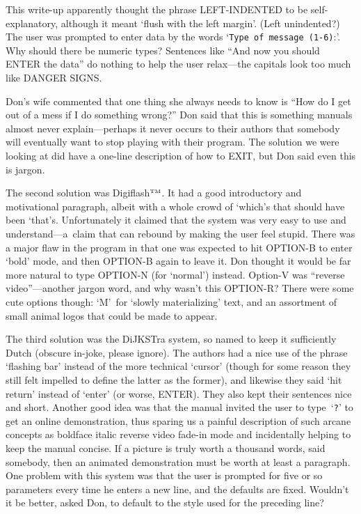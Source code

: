 This write-up apparently thought the phrase LEFT-INDENTED to be
self-explanatory, although it meant `flush with the left margin'.
(Left unindented?)
The user was prompted to enter data by the words
`{\tt Type of message (1-6)}:'.
Why should there be numeric types? Sentences like ``And now you
should ENTER the data'' do nothing to help the user relax---the capitals
look too much like DANGER SIGNS.

Don's wife commented that one thing she always needs to know is
``How do I get out of a mess if I do something wrong?'' Don said that
this is something manuals almost never explain---perhaps it never
occurs to their authors that somebody will eventually want to stop
playing with their program. The solution we were looking at did have
a one-line description of how to EXIT, but Don said
even this is jargon.

The second solution was Digiflash$^{\scriptscriptstyle\rm TM}$. It had a
good introductory and motivational paragraph, albeit with a whole crowd
of `which's that should have been `that's. Unfortunately it claimed
that the system was very easy to use and understand---a~claim that can
rebound by making the user feel stupid. There was a major flaw in the
program in that one was expected to hit OPTION-B to enter `bold' mode,
and then OPTION-B again to leave it. Don thought it would be far more
natural to type OPTION-N (for `normal') instead. Option-V was
``reverse video''---another jargon word, and why wasn't this
OPTION-R? There were some cute options though: `M'~for `slowly materializing'
text, and an assortment of small animal logos that could be made to appear.

The third solution was the DiJKSTra system, so named to keep it
sufficiently Dutch (obscure in-joke, please ignore). The authors had
a nice use of the phrase `flashing bar' instead of the more technical
`cursor' (though for some reason they still felt impelled to define
the latter as the former), and likewise they said `hit return' instead
of `enter' (or worse, ENTER). They also kept their sentences nice and
short. Another good idea was that the manual invited the user
to type~`{\tt ?}' to get an online demonstration, thus sparing us a painful
description of such arcane concepts as boldface italic reverse video
fade-in mode and incidentally helping to keep the manual concise. If a
picture is truly worth a thousand words, said somebody, then an animated
demonstration must be worth at least a paragraph. One problem with this
system was that the user is prompted for five or so parameters every time
he enters a new line, and the defaults are fixed. Wouldn't it be better,
asked Don, to default to the style used for the preceding line?

